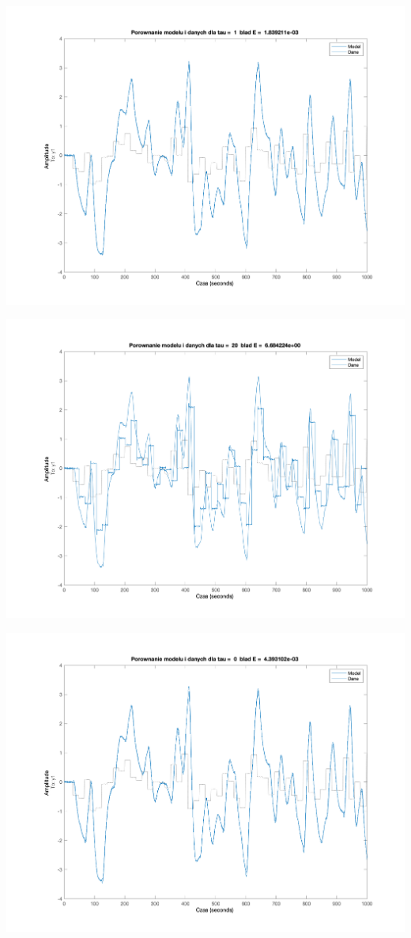 \documentclass[a4paper, 11pt]{article}
\begin{document}
\begin{enumerate}
 \includegraphics[width=\linewidth]{./ModelsP1/modelTau1.png} 
 
 \includegraphics[width=\linewidth]{./ModelsP1/modelTau20.png} 
 
 \includegraphics[width=\linewidth]{./ModelsP1/modelTau0.png} 
 

\end{enumerate}
\end{document}
